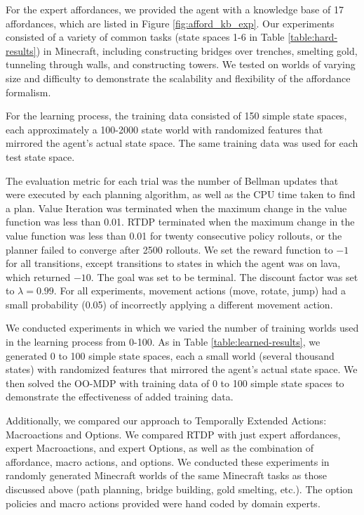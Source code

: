 \documentclass[conference]{IEEEtran}
\begin{document}
For the expert affordances, we provided the agent with a knowledge base of 17 affordances,
which are listed in Figure \ref{fig:afford_kb_exp}.  Our experiments
consisted of a variety of common tasks (state spaces 1-6 in Table \ref{table:hard-results}) in Minecraft, including
constructing bridges over trenches, smelting gold, tunneling
through walls, and constructing towers.  We tested on worlds of varying size
and difficulty to demonstrate the scalability and flexibility of the
affordance formalism.

For the learning process, the training data consisted of 150 simple state
spaces, each approximately a 100-2000 state world with randomized features that mirrored the agent's actual state space. The same training data was used
for each test state space.

The evaluation metric for each trial was the
number of Bellman updates that were executed by each planning
algorithm, as well as the CPU time taken to find a plan. Value Iteration was terminated when the maximum change in
the value function was less than 0.01. RTDP terminated when the
maximum change in the value function was less than 0.01 for twenty
consecutive policy rollouts, or the planner failed to converge after 2500 rollouts.
We set the reward function to $-1$ for all transitions, except
transitions to states in which the agent was on lava, which returned 
$-10$. The goal was set to be terminal. The discount
factor was set to $\lambda = 0.99$. For all experiments, movement actions
(move, rotate, jump) had a small probability (0.05) of incorrectly applying a different movement action.

We conducted experiments in which we varied the number of training worlds
used in the learning process from 0-100. As in Table \ref{table:learned-results}, we generated 0 to 100 simple state
spaces, each a small world (several thousand states) with randomized features that mirrored the agent's actual state space. We then solved
the OO-MDP with training data of 0 to 100 simple state spaces to demonstrate the effectiveness of added training data.

Additionally, we compared our approach to Temporally Extended Actions: Macroactions and Options. We compared RTDP with just expert affordances,
expert Macroactions, and expert Options, as well as the combination of affordance, macro actions, and options. We conducted these experiments in randomly generated Minecraft worlds of the same Minecraft tasks as those discussed above (path planning, bridge building, gold smelting, etc.). The option policies and macro actions provided were hand coded by domain experts.
\end{document}

